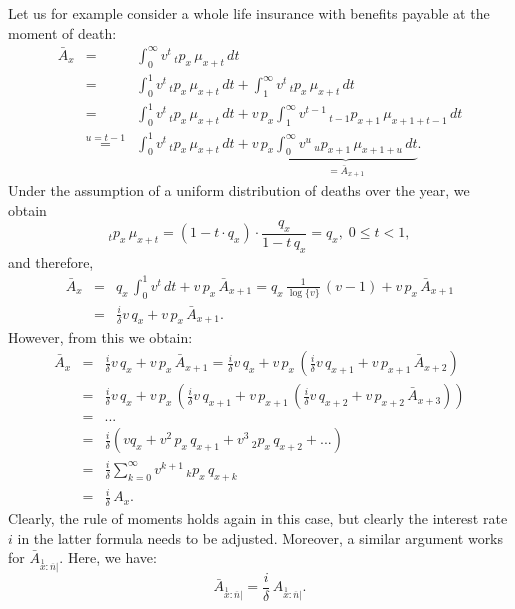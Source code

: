 \documentclass[11pt,fleqn,oneside]{book}
\begin{document}
Let us for example consider a whole life insurance with benefits payable at the moment of death:
\begin{eqnarray*}
{\bar{A}_x} &=& \int_0^\infty v^t\,{_tp_x}\,{\mu_{x+t}}\,dt\\
&=& \int_0^1 v^t\,{_tp_x}\,{\mu_{x+t}}\,dt + \int_1^\infty v^t\,{_tp_x}\,{\mu_{x+t}}\,dt\\
&=& \int_0^1 v^t\,{_tp_x}\,{\mu_{x+t}}\,dt + v\,{p_x}\int_1^\infty v^{t-1}\,{_{t-1}p_{x+1}}\,{\mu_{x+1+t-1}}\,dt\\
&\stackrel{u=t-1}{=}& \int_0^1 v^t\,{_tp_x}\,{\mu_{x+t}}\,dt + v\,{p_x}\underbrace{\int_0^\infty v^{u}\,{_{u}p_{x+1}}\,{\mu_{x+1+u}}\,dt}_{={\bar{A}_{x+1}}}.
\end{eqnarray*}
Under the assumption of a uniform distribution of deaths over the year, we obtain
$$
{_tp_x}\,{\mu_{x+t}} = (1 - t\cdot q_x)\cdot \frac{q_x}{1-t\,q_x} = q_x,\;0\leq t < 1,
$$
and therefore,
\begin{eqnarray*}
{\bar{A}_x} &=& q_x\, \int_0^1 v^t\,dt + v\,{p_x}\,{\bar{A}_{x+1}} = q_x\,\frac{1}{\log\{v\}}\,(v-1) + v\,{p_x}\,{\bar{A}_{x+1}}\\
&=& \frac{i}{\delta} v \, q_x +  v\,{p_x}\,{\bar{A}_{x+1}}.
\end{eqnarray*}
However, from this we obtain:
\begin{eqnarray*}
{\bar{A}_x} &=& \frac{i}{\delta} v \, q_x +  v\,{p_x}\,{\bar{A}_{x+1}}
   = \frac{i}{\delta} v \, q_x +  v\,{p_x}\,\left({\frac{i}{\delta} v \, q_{x+1} +  v\,{p_{x+1}}\,{\bar{A}_{x+2}}}\right)\\
   &=& \frac{i}{\delta} v \, q_x +  v\,{p_x}\,\left(\frac{i}{\delta} v \, q_{x+1} +  v\,{p_{x+1}}\,\left({\frac{i}{\delta} v \, q_{x+2} +  v\,{p_{x+2}}\,{\bar{A}_{x+3}}}\right)\right)\\
&=&...\\
&=&\frac{i}{\delta}\left(vq_x + v^2\,{p_x}\,{q_{x+1}} + v^3\,{_2p_x}\,{q_{x+2}} + ...\right)\\
&=& \frac{i}{\delta} \sum_{k=0}^\infty v^{k+1}\,{_kp_x}\,q_{x+k} \\
&=& \frac{i}{\delta} \,A_x.
\end{eqnarray*}
Clearly, the rule of moments holds again in this case, but clearly the interest rate $i$ in the latter formula needs to be adjusted. Moreover, a similar argument works for ${\bar{A}}_{\stackrel{1}{x}:\overline{n}|}$. Here, we have:
$$
{\bar{A}}_{\stackrel{1}{x}:\overline{n}|} = \frac{i}{\delta} \, {A}_{\stackrel{1}{x}:\overline{n}|}.
$$ 
\end{document}
